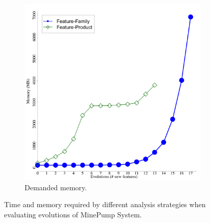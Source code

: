 \begin{figure}[p]
\begin{subfigure}[t]{0.5\columnwidth}
    \includegraphics[width=1.0\columnwidth]{img/minepumpSpace}
    \caption{Demanded memory.}
    \label{fig:minepump-footprint}
  \end{subfigure}
  \caption{Time and memory required by different analysis strategies when
  evaluating evolutions of MinePump System.}
  \label{fig:minepump-scalability}
\end{figure}


